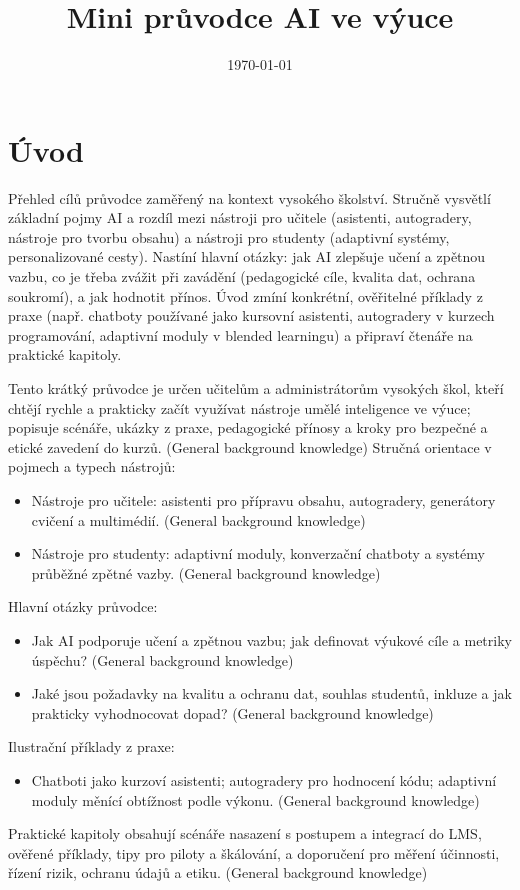 \documentclass{report}%
\title{Mini průvodce AI ve výuce}%
\date{\today}%
\begin{document}
%
\normalsize%
%
\hypersetup{pageanchor=false}%
%
\maketitle%
\tableofcontents%
\clearpage%
\hypersetup{pageanchor=true}%
%
\chapter{Úvod}%
Přehled cílů průvodce zaměřený na kontext vysokého školství. Stručně vysvětlí základní pojmy AI a rozdíl mezi nástroji pro učitele (asistenti, autogradery, nástroje pro tvorbu obsahu) a nástroji pro studenty (adaptivní systémy, personalizované cesty). Nastíní hlavní otázky: jak AI zlepšuje učení a zpětnou vazbu, co je třeba zvážit při zavádění (pedagogické cíle, kvalita dat, ochrana soukromí), a jak hodnotit přínos. Úvod zmíní konkrétní, ověřitelné příklady z praxe (např. chatboty používané jako kursovní asistenti, autogradery v kurzech programování, adaptivní moduly v blended learningu) a připraví čtenáře na praktické kapitoly.%


%
Tento krátký průvodce je určen učitelům a administrátorům vysokých škol, kteří chtějí rychle a prakticky začít využívat nástroje umělé inteligence ve výuce; popisuje scénáře, ukázky z praxe, pedagogické přínosy a kroky pro bezpečné a etické zavedení do kurzů. (General background knowledge)
Stručná orientace v pojmech a typech nástrojů:
\begin{itemize}
  \item Nástroje pro učitele: asistenti pro přípravu obsahu, autogradery, generátory cvičení a multimédií. (General background knowledge)
  \item Nástroje pro studenty: adaptivní moduly, konverzační chatboty a systémy průběžné zpětné vazby. (General background knowledge)
\end{itemize}
Hlavní otázky průvodce:
\begin{itemize}
  \item Jak AI podporuje učení a zpětnou vazbu; jak definovat výukové cíle a metriky úspěchu? (General background knowledge)
  \item Jaké jsou požadavky na kvalitu a ochranu dat, souhlas studentů, inkluze a jak prakticky vyhodnocovat dopad? (General background knowledge)
\end{itemize}
Ilustrační příklady z praxe:
\begin{itemize}
  \item Chatboti jako kurzoví asistenti; autogradery pro hodnocení kódu; adaptivní moduly měnící obtížnost podle výkonu. (General background knowledge)
\end{itemize}
Praktické kapitoly obsahují scénáře nasazení s postupem a integrací do LMS, ověřené příklady, tipy pro piloty a škálování, a doporučení pro měření účinnosti, řízení rizik, ochranu údajů a etiku. (General background knowledge)%
\end{document}
